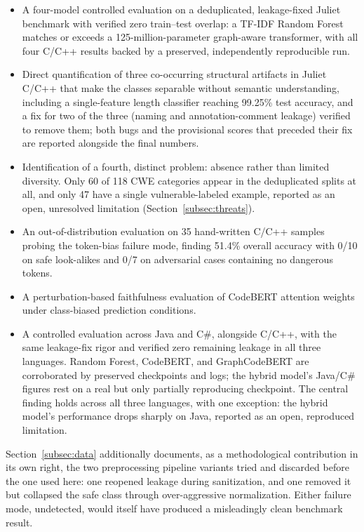 \documentclass{ieeeaccess}
\begin{document}
\begin{itemize}
\item A four-model controlled evaluation on a deduplicated, leakage-fixed Juliet benchmark with verified zero train--test overlap: a TF-IDF Random Forest matches or exceeds a 125-million-parameter graph-aware transformer, with all four C/C++ results backed by a preserved, independently reproducible run.
\item Direct quantification of three co-occurring structural artifacts in Juliet C/C++ that make the classes separable without semantic understanding, including a single-feature length classifier reaching 99.25\% test accuracy, and a fix for two of the three (naming and annotation-comment leakage) verified to remove them; both bugs and the provisional scores that preceded their fix are reported alongside the final numbers.
\item Identification of a fourth, distinct problem: absence rather than limited diversity. Only 60 of 118 CWE categories appear in the deduplicated splits at all, and only 47 have a single vulnerable-labeled example, reported as an open, unresolved limitation (Section~\ref{subsec:threats}).
\item An out-of-distribution evaluation on 35 hand-written C/C++ samples probing the token-bias failure mode, finding 51.4\% overall accuracy with 0/10 on safe look-alikes and 0/7 on adversarial cases containing no dangerous tokens.
\item A perturbation-based faithfulness evaluation of CodeBERT attention weights under class-biased prediction conditions.
\item A controlled evaluation across Java and C\#, alongside C/C++, with the same leakage-fix rigor and verified zero remaining leakage in all three languages. Random Forest, CodeBERT, and GraphCodeBERT are corroborated by preserved checkpoints and logs; the hybrid model's Java/C\# figures rest on a real but only partially reproducing checkpoint. The central finding holds across all three languages, with one exception: the hybrid model's performance drops sharply on Java, reported as an open, reproduced limitation.
\end{itemize}

Section~\ref{subsec:data} additionally documents, as a methodological contribution in its own right, the two preprocessing pipeline variants tried and discarded before the one used here: one reopened leakage during sanitization, and one removed it but collapsed the safe class through over-aggressive normalization. Either failure mode, undetected, would itself have produced a misleadingly clean benchmark result.
\end{document}
